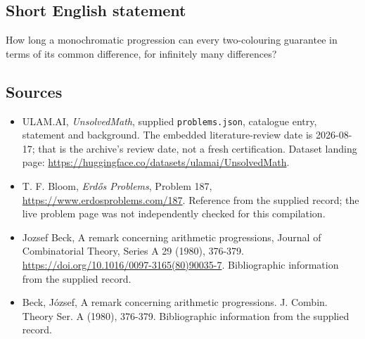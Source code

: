 \documentclass[11pt,a4paper]{article}
\begin{document}
\subsection{Short English statement}

How long a monochromatic progression can every two-colouring guarantee in terms of its common difference, for infinitely many differences?

\subsection{Sources}

{\small

\begin{itemize}

\item[\hypertarget{source:statement:1}{S1}] ULAM.AI, \emph{UnsolvedMath}, supplied \texttt{problems.json}, catalogue entry, statement and background. The embedded literature-review date is 2026-08-17; that is the archive’s review date, not a fresh certification. Dataset landing page: \url{https://huggingface.co/datasets/ulamai/UnsolvedMath}.

\item[\hypertarget{source:statement:2}{S2}] T. F. Bloom, \emph{Erdős Problems}, Problem 187, \url{https://www.erdosproblems.com/187}. Reference from the supplied record; the live problem page was not independently checked for this compilation.

\item[\hypertarget{source:statement:3}{S3}] Jozsef Beck, A remark concerning arithmetic progressions, Journal of Combinatorial Theory, Series A 29 (1980), 376-379. \url{https://doi.org/10.1016/0097-3165(80)90035-7}. Bibliographic information from the supplied record.

\item[\hypertarget{source:statement:4}{S4}] Beck, J\'{o}zsef, A remark concerning arithmetic progressions. J. Combin. Theory Ser. A (1980), 376-379. Bibliographic information from the supplied record.

\end{itemize}

}

\label{end:statement}
\end{document}
